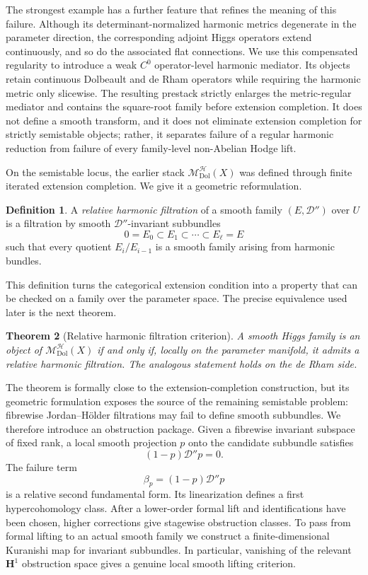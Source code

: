 \documentclass[11pt,reqno]{amsart}
\newtheorem{theorem}{Theorem}[section]
\theoremstyle{definition}
\newtheorem{definition}[theorem]{Definition}
\theoremstyle{remark}
\newcommand{\cD}{\mathcal D}
\newcommand{\cH}{\mathcal H}
\newcommand{\Dol}{\mathrm{Dol}}
\newcommand{\MHDol}{\mathscr M^{\cH}_{\Dol}}
\begin{document}
The strongest example has a further feature that refines the meaning of this failure.  Although its determinant-normalized harmonic metrics degenerate in the parameter direction, the corresponding adjoint Higgs operators extend continuously, and so do the associated flat connections.  We use this compensated regularity to introduce a weak $C^0$ operator-level harmonic mediator.  Its objects retain continuous Dolbeault and de Rham operators while requiring the harmonic metric only slicewise.  The resulting prestack strictly enlarges the metric-regular mediator and contains the square-root family before extension completion.  It does not define a smooth transform, and it does not eliminate extension completion for strictly semistable objects; rather, it separates failure of a regular harmonic reduction from failure of every family-level non-Abelian Hodge lift.

On the semistable locus, the earlier stack $\MHDol(X)$ was defined through finite iterated extension completion.  We give it a geometric reformulation.

\begin{definition}
A \emph{relative harmonic filtration} of a smooth family $(E,\cD'')$ over $U$ is a filtration by smooth $\cD''$-invariant subbundles
\[
  0=E_0\subset E_1\subset\cdots\subset E_\ell=E
\]
such that every quotient $E_i/E_{i-1}$ is a smooth family arising from harmonic bundles.
\end{definition}

This definition turns the categorical extension condition into a property that can be checked on a family over the parameter space.  The precise equivalence used later is the next theorem.

\begin{theorem}[Relative harmonic filtration criterion]\label{thm:intro-filtration}
A smooth Higgs family is an object of $\MHDol(X)$ if and only if, locally on the parameter manifold, it admits a relative harmonic filtration.  The analogous statement holds on the de Rham side.
\end{theorem}

The theorem is formally close to the extension-completion construction, but its geometric formulation exposes the source of the remaining semistable problem: fibrewise Jordan--H\"older filtrations may fail to define smooth subbundles.  We therefore introduce an obstruction package.  Given a fibrewise invariant subspace of fixed rank, a local smooth projection $p$ onto the candidate subbundle satisfies
\[
  (1-p)\cD''p=0.
\]
The failure term
\[
  \beta_p=(1-p)\cD''p
\]
is a relative second fundamental form.  Its linearization defines a first hypercohomology class.  After a lower-order formal lift and identifications have been chosen, higher corrections give stagewise obstruction classes.  To pass from formal lifting to an actual smooth family we construct a finite-dimensional Kuranishi map for invariant subbundles.  In particular, vanishing of the relevant $\mathbf H^1$ obstruction space gives a genuine local smooth lifting criterion.
\end{document}

